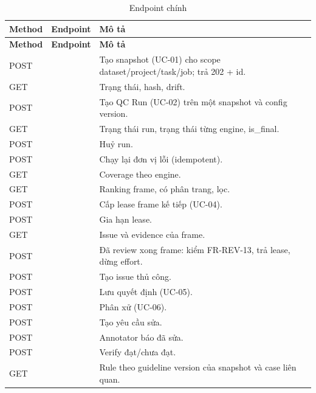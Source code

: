 \begin{xltabular}{\linewidth}{@{}L{1.4cm}L{5.2cm}Y@{}}
\caption{Endpoint chính}\label{tab:api}\\
\toprule
\textbf{Method} & \textbf{Endpoint} & \textbf{Mô tả}\\
\midrule
\endfirsthead
\toprule \textbf{Method} & \textbf{Endpoint} & \textbf{Mô tả}\\ \midrule
\endhead
\bottomrule
\endfoot
POST &  & Tạo snapshot (UC-01) cho scope dataset/project/task/job; trả 202 + id.\\
GET &  & Trạng thái, hash, drift.\\
POST &  & Tạo QC Run (UC-02) trên một snapshot và config version.\\
GET &  & Trạng thái run, trạng thái từng engine, is\_final.\\
POST &  & Huỷ run.\\
POST &  & Chạy lại đơn vị lỗi (idempotent).\\
GET &  & Coverage theo engine.\\
GET &  & Ranking frame, có phân trang, lọc.\\
POST &  & Cấp lease frame kế tiếp (UC-04).\\
POST &  & Gia hạn lease.\\
GET &  & Issue và evidence của frame.\\
POST &  & Đã review xong frame: kiểm FR-REV-13, trả lease, dừng effort.\\
POST &  & Tạo issue thủ công.\\
POST &  & Lưu quyết định (UC-05).\\
POST &  & Phân xử (UC-06).\\
POST &  & Tạo yêu cầu sửa.\\
POST &  & Annotator báo đã sửa.\\
POST &  & Verify đạt/chưa đạt.\\
GET &  & Rule theo guideline version của snapshot và case liên quan.\\

\end{xltabular}
